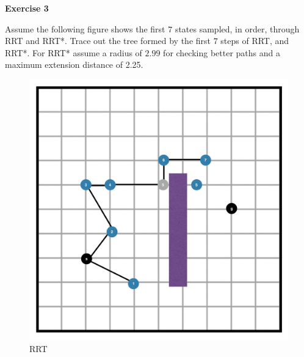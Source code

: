 \documentclass[11pt]{article}
\newif\ifsol
\begin{document}
\newpage


{\bf{Exercise 3}}

Assume the following figure shows the first $7$ states sampled, in order, through RRT and RRT*. Trace out the tree formed by the first $7$ steps of RRT, and RRT*. For RRT* assume a radius of $2.99$ for checking better paths and a maximum extension distance of 2.25.

\ifsol
    \begin{figure}[ht]
    \centering
    \includegraphics[scale=0.35]{figures/finalfinalfinalrrtsoln}
    \caption{RRT}
    \end{figure}
    
\end{document}
